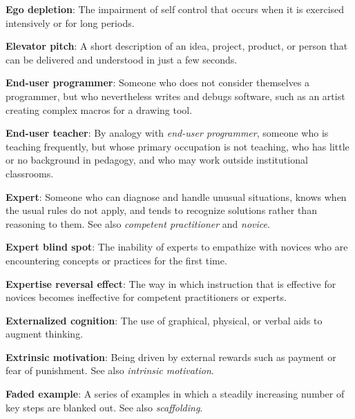 \textbf{\hypertarget{g:ego-depletion}{Ego depletion}\label{g:ego-depletion}}: The impairment of self
control that occurs when it is exercised intensively or for long
periods.

\textbf{\hypertarget{g:elevator-pitch}{Elevator pitch}\label{g:elevator-pitch}}: A short description of an
idea, project, product, or person that can be delivered and understood
in just a few seconds.

\textbf{\hypertarget{g:end-user-programmer}{End-user programmer}\label{g:end-user-programmer}}: Someone who
does not consider themselves a programmer, but who nevertheless writes
and debugs software, such as an artist creating complex macros for a
drawing tool.

\textbf{\hypertarget{g:end-user-teacher}{End-user teacher}\label{g:end-user-teacher}}: By analogy with
\emph{end-user programmer}, someone who is teaching frequently, but whose
primary occupation is not teaching, who has little or no background in
pedagogy, and who may work outside institutional classrooms.

\textbf{\hypertarget{g:expert}{Expert}\label{g:expert}}: Someone who can diagnose and handle
unusual situations, knows when the usual rules do not apply, and tends
to recognize solutions rather than reasoning to them. See also
\emph{competent practitioner} and \emph{novice}.

\textbf{\hypertarget{g:expert-blind-spot}{Expert blind spot}\label{g:expert-blind-spot}}: The inability of
experts to empathize with novices who are encountering concepts or
practices for the first time.

\textbf{\hypertarget{g:expertise-reversal}{Expertise reversal effect}\label{g:expertise-reversal}}: The way in
which instruction that is effective for novices becomes ineffective for
competent practitioners or experts.

\textbf{\hypertarget{g:externalized-cognition}{Externalized cognition}\label{g:externalized-cognition}}: The use
of graphical, physical, or verbal aids to augment thinking.

\textbf{\hypertarget{g:extrinsic-motivation}{Extrinsic motivation}\label{g:extrinsic-motivation}}: Being driven
by external rewards such as payment or fear of punishment. See also
\emph{intrinsic motivation}.

\textbf{\hypertarget{g:faded-example}{Faded example}\label{g:faded-example}}: A series of examples in
which a steadily increasing number of key steps are blanked out. See
also \emph{scaffolding}.

